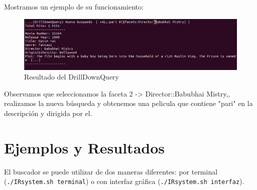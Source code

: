 \newpage
Mostramos un ejemplo de su funcionamiento:
	
\begin{figure}[H]
	\centering
	\includegraphics[scale=0.4]{images/result-facetas.png}
	\caption{Resultado del DrillDownQuery}
\end{figure}

Observamos que seleccionamos la faceta 2 -> Director::Babubhai Mistry,, realizamos la nueva búsqueda y obtenemos una pelicula que contiene "pari" en la descripción y dirigida por el.
	
	



\newpage


\section{Ejemplos y Resultados}
\hspace{1cm} El buscador se puede utilizar de dos maneras diferentes: por terminal (\texttt{./IRsystem.sh terminal}) o con interfaz gráfica (\texttt{./IRsystem.sh interfaz}).


